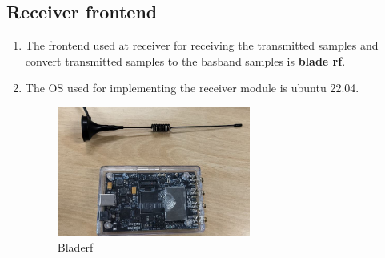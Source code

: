 \subsection{Receiver frontend}
\begin{enumerate}
    \item The frontend used at receiver for receiving the transmitted samples and convert transmitted samples to the basband samples is \textbf{blade rf}.
    \item The OS used for implementing the receiver module is ubuntu 22.04.
    \begin{normalsize}
        \begin{figure}[!ht]
            \centering
            \includegraphics[width=0.6\textwidth]{figs/bladerf.png}
            \centering
            \captionsetup{justification=centering}
            \caption{Bladerf}
            \end{figure}
        \end{normalsize}
    
\end{enumerate}
